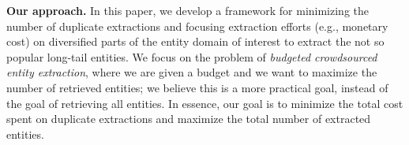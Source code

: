 \noindent
{\bf Our approach.} 
In this paper, we develop a framework for minimizing the number of duplicate extractions and focusing extraction efforts (e.g., monetary cost) on diversified parts of the entity domain of interest to extract the not so popular long-tail entities. We focus on the problem of {\em budgeted crowdsourced entity extraction}, where we are given a budget and we want to maximize the number of retrieved entities; we believe this is a more practical goal, instead of the goal of retrieving all entities.  In essence, our goal is to minimize the total cost spent on duplicate extractions and maximize the total number of extracted entities. 








